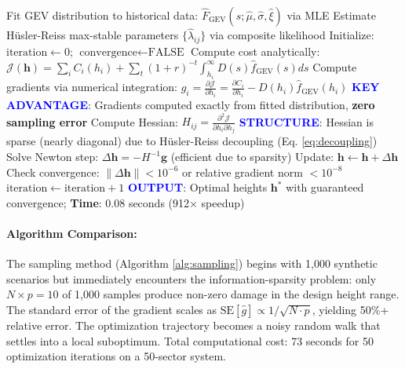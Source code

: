 \documentclass[review]{elsarticle}
\begin{document}
\begin{algorithm}[ht]
\caption{Analytical GEV + Newton's Method for Seawall Optimization}
\label{alg:analytical_gev}
\begin{algorithmic}[1]
\State Fit GEV distribution to historical data: $\hat{F}_{\text{GEV}}(s; \hat{\mu}, \hat{\sigma}, \hat{\xi})$ via MLE
\State Estimate Hüsler-Reiss max-stable parameters $\{\hat{\lambda}_{ij}\}$ via composite likelihood \cite{padoan2010multivariate}
\State Initialize: $\text{iteration} \leftarrow 0$; $\text{convergence} \leftarrow \text{FALSE}$
  \State Compute cost analytically: $\mathcal{J}(\mathbf{h}) = \sum_i C_i(h_i) + \sum_t (1+r)^{-t} \int_{h_i}^{\infty} D(s) \hat{f}_{\text{GEV}}(s) ds$
  \State Compute gradients via numerical integration: $g_i = \frac{\partial \mathcal{J}}{\partial h_i} = \frac{\partial C_i}{\partial h_i} - D(h_i) \hat{f}_{\text{GEV}}(h_i)$
  \State \textcolor{blue}{\textbf{KEY ADVANTAGE}}: Gradients computed exactly from fitted distribution, \textbf{zero sampling error}
  \State Compute Hessian: $H_{ij} = \frac{\partial^2 \mathcal{J}}{\partial h_i \partial h_j}$
  \State \textcolor{blue}{\textbf{STRUCTURE}}: Hessian is sparse (nearly diagonal) due to Hüsler-Reiss decoupling (Eq. \ref{eq:decoupling})
  \State Solve Newton step: $\Delta \mathbf{h} = -H^{-1} \mathbf{g}$ (efficient due to sparsity)
  \State Update: $\mathbf{h} \leftarrow \mathbf{h} + \Delta \mathbf{h}$
  \State Check convergence: $\|\Delta \mathbf{h}\| < 10^{-6}$ or relative gradient norm $< 10^{-8}$
  \State $\text{iteration} \leftarrow \text{iteration} + 1$
\EndWhile
\State \textcolor{blue}{\textbf{OUTPUT}}: Optimal heights $\mathbf{h}^*$ with guaranteed convergence; \textbf{Time}: 0.08 seconds (912× speedup)
\end{algorithmic}
\end{algorithm}

\paragraph{Algorithm Comparison:}

The sampling method (Algorithm \ref{alg:sampling}) begins with 1,000 synthetic scenarios but immediately encounters the information-sparsity problem: only $N \times p = 10$ of 1,000 samples produce non-zero damage in the design height range. The standard error of the gradient scales as $\text{SE}[\hat{g}] \propto 1/\sqrt{N \cdot p}$, yielding 50\%+ relative error. The optimization trajectory becomes a noisy random walk that settles into a local suboptimum. Total computational cost: 73 seconds for 50 optimization iterations on a 50-sector system.
\end{document}
